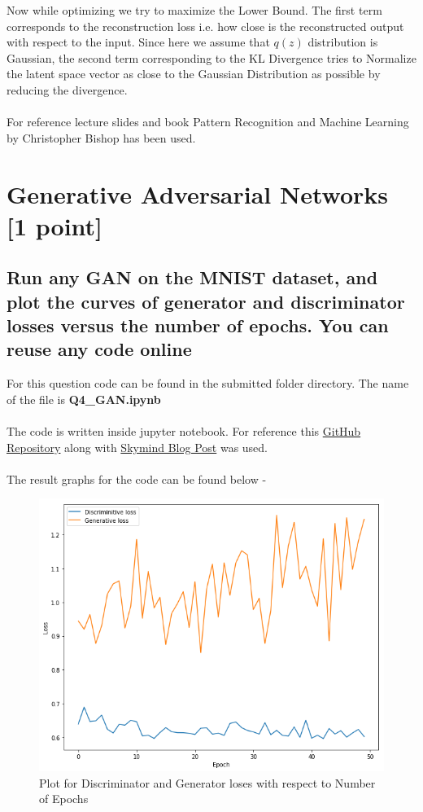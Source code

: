Now while optimizing we try to maximize the Lower Bound. The first term corresponds to the reconstruction loss i.e. how close is the reconstructed output with respect to the input.  Since here we assume that $q(z)$ distribution is Gaussian, the second term corresponding to the KL Divergence tries to Normalize the latent space vector as close to the Gaussian Distribution as possible by reducing the divergence.
\\ \\
For reference lecture slides and book Pattern Recognition and Machine Learning by Christopher Bishop has been used. 

\section{Generative Adversarial Networks [1 point]}
\subsection{Run any GAN on the MNIST dataset, and plot the curves of generator and discriminator losses versus the number of epochs. You can reuse any code online} 

For this question code can be found in the submitted folder directory. 
The name of the file is \textbf{Q4\_GAN.ipynb}\\ \\ 
The code is written inside jupyter notebook. For reference this \href{https://github.com/Zackory/Keras-MNIST-GAN}{GitHub Repository} along with \href{https://skymind.ai/wiki/generative-adversarial-network-gan}{Skymind Blog Post} was used. \\ \\ 

The result graphs for the code can be found below - \\
\begin{figure}[h]
\includegraphics[width=16cm]{Q4_GAN.png}
\centering
\caption{Plot for Discriminator and Generator loses with respect to Number of Epochs}
\end{figure}




